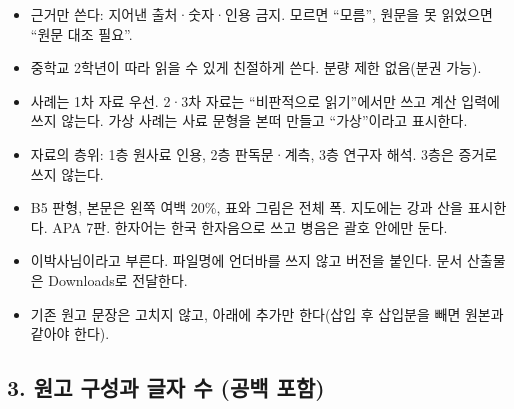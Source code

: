 \documentclass[10pt,a4paper]{article}
\providecommand{\tightlist}{\setlength{\itemsep}{0pt}\setlength{\parskip}{0pt}}
\begin{document}
\begin{itemize}
\tightlist
\item
  근거만 쓴다: 지어낸 출처·숫자·인용 금지. 모르면 ``모름'', 원문을 못 읽었으면 ``원문 대조 필요''.
\item
  중학교 2학년이 따라 읽을 수 있게 친절하게 쓴다. 분량 제한 없음(분권 가능).
\item
  사례는 1차 자료 우선. 2·3차 자료는 ``비판적으로 읽기''에서만 쓰고 계산 입력에 쓰지 않는다. 가상 사례는 사료 문형을 본떠 만들고 ``가상''이라고 표시한다.
\item
  자료의 층위: 1층 원사료 인용, 2층 판독문·계측, 3층 연구자 해석. 3층은 증거로 쓰지 않는다.
\item
  B5 판형, 본문은 왼쪽 여백 20\%, 표와 그림은 전체 폭. 지도에는 강과 산을 표시한다. APA 7판. 한자어는 한국 한자음으로 쓰고 병음은 괄호 안에만 둔다.
\item
  이박사님이라고 부른다. 파일명에 언더바를 쓰지 않고 버전을 붙인다. 문서 산출물은 Downloads로 전달한다.
\item
  기존 원고 문장은 고치지 않고, 아래에 추가만 한다(삽입 후 삽입분을 빼면 원본과 같아야 한다).
\end{itemize}

\hypertarget{uxc6d0uxace0-uxad6cuxc131uxacfc-uxae00uxc790-uxc218-uxacf5uxbc31-uxd3ecuxd568}{%
\subsection{3. 원고 구성과 글자 수 (공백 포함)}\label{uxc6d0uxace0-uxad6cuxc131uxacfc-uxae00uxc790-uxc218-uxacf5uxbc31-uxd3ecuxd568}}
\end{document}
